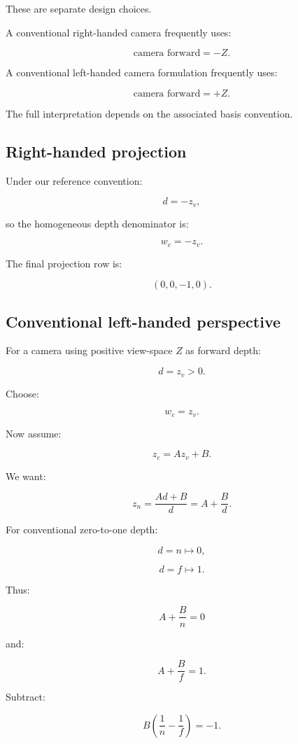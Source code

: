 These are separate design choices.

A conventional right-handed camera frequently uses:

\[
 \boxed{ \text{camera forward}=-Z }.
\]

A conventional left-handed camera formulation frequently uses:

\[
 \boxed{ \text{camera forward}=+Z }.
\]

The full interpretation depends on the associated basis convention.

\subsection{Right-handed projection}\label{02-foundations-ii-ch033-right-handed-projection}

Under our reference convention:

\[
 d=-z_v,
\]

so the homogeneous depth denominator is:

\[
 \boxed{w_c=-z_v}.
\]

The final projection row is:

\[
 \boxed{ (0,0,-1,0) }.
\]

\subsection{Conventional left-handed perspective}\label{02-foundations-ii-ch033-conventional-left-handed-perspective}

For a camera using positive view-space \(Z\) as forward depth:

\[
 d=z_v>0.
\]

Choose:

\[
 \boxed{w_c=z_v}.
\]

Now assume:

\[
 z_c=Az_v+B.
\]

We want:

\[
 z_n=\frac{Ad+B}{d} =A+\frac Bd.
\]

For conventional zero-to-one depth:

\[
 d=n\mapsto0,
\]

\[
 d=f\mapsto1.
\]

Thus:

\[
 A+\frac Bn=0
\]

and:

\[
 A+\frac Bf=1.
\]

Subtract:

\[
 B\left(\frac1n-\frac1f\right)=-1.
\]


